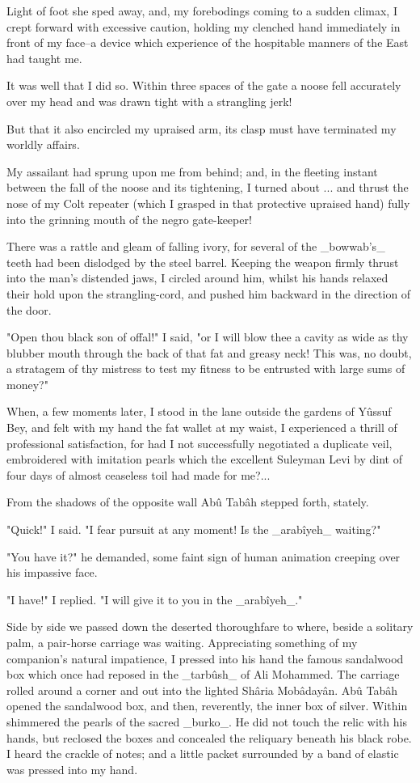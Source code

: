 Light of foot she sped away, and, my forebodings coming to a sudden
climax, I crept forward with excessive caution, holding my clenched
hand immediately in front of my face--a device which experience of
the hospitable manners of the East had taught me.

It was well that I did so. Within three spaces of the gate a noose
fell accurately over my head and was drawn tight with a strangling
jerk!

But that it also encircled my upraised arm, its clasp must have
terminated my worldly affairs.

My assailant had sprung upon me from behind; and, in the fleeting
instant between the fall of the noose and its tightening, I turned
about ... and thrust the nose of my Colt repeater (which I grasped in
that protective upraised hand) fully into the grinning mouth of the
negro gate-keeper!

There was a rattle and gleam of falling ivory, for several of the
_bowwab's_ teeth had been dislodged by the steel barrel. Keeping the
weapon firmly thrust into the man's distended jaws, I circled around
him, whilst his hands relaxed their hold upon the strangling-cord,
and pushed him backward in the direction of the door.

"Open thou black son of offal!" I said, "or I will blow thee a cavity
as wide as thy blubber mouth through the back of that fat and greasy
neck! This was, no doubt, a stratagem of thy mistress to test my
fitness to be entrusted with large sums of money?"

When, a few moments later, I stood in the lane outside the gardens
of Yûssuf Bey, and felt with my hand the fat wallet at my waist,
I experienced a thrill of professional satisfaction, for had I not
successfully negotiated a duplicate veil, embroidered with imitation
pearls which the excellent Suleyman Levi by dint of four days of
almost ceaseless toil had made for me?...

From the shadows of the opposite wall Abû Tabâh stepped forth,
stately.

"Quick!" I said. "I fear pursuit at any moment! Is the _arabîyeh_
waiting?"

"You have it?" he demanded, some faint sign of human animation
creeping over his impassive face.

"I have!" I replied. "I will give it to you in the _arabîyeh_."

Side by side we passed down the deserted thoroughfare to where, beside
a solitary palm, a pair-horse carriage was waiting. Appreciating
something of my companion's natural impatience, I pressed into his
hand the famous sandalwood box which once had reposed in the _tarbûsh_
of Ali Mohammed. The carriage rolled around a corner and out into the
lighted Shâria Mobâdayân. Abû Tabâh opened the sandalwood box, and
then, reverently, the inner box of silver. Within shimmered the pearls
of the sacred _burko_. He did not touch the relic with his hands, but
reclosed the boxes and concealed the reliquary beneath his black robe.
I heard the crackle of notes; and a little packet surrounded by a band
of elastic was pressed into my hand.

